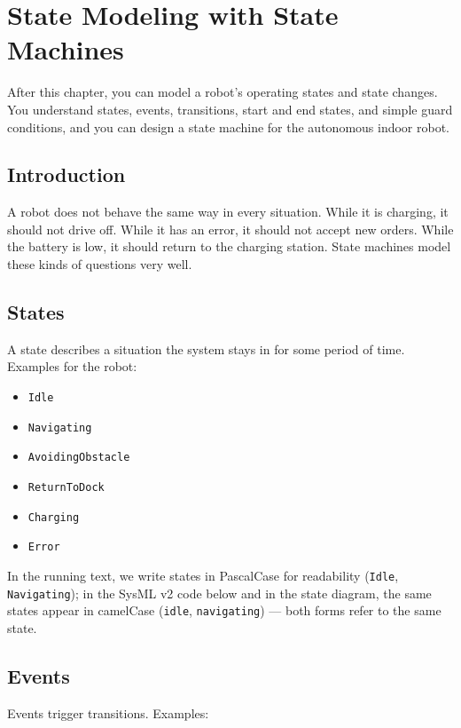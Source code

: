 \chapter{State Modeling with State Machines}

\begin{lernziele}
After this chapter, you can model a robot's operating states and state changes. You understand states, events, transitions, start and end states, and simple guard conditions, and you can design a state machine for the autonomous indoor robot.
\end{lernziele}

\section{Introduction}
A robot does not behave the same way in every situation. While it is charging, it should not drive off. While it has an error, it should not accept new orders. While the battery is low, it should return to the charging station. State machines model these kinds of questions very well.

\section{States}
A state describes a situation the system stays in for some period of time. Examples for the robot:

\begin{itemize}
    \item \texttt{Idle}
    \item \texttt{Navigating}
    \item \texttt{AvoidingObstacle}
    \item \texttt{ReturnToDock}
    \item \texttt{Charging}
    \item \texttt{Error}
\end{itemize}

In the running text, we write states in PascalCase for readability (\texttt{Idle}, \texttt{Navigating}); in the SysML v2 code below and in the state diagram, the same states appear in camelCase (\texttt{idle}, \texttt{navigating}) — both forms refer to the same state.

\section{Events}
Events trigger transitions. Examples:

